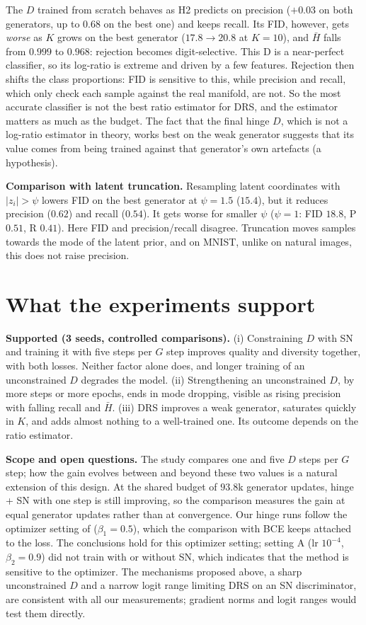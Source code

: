\documentclass[10pt,a4paper]{article}
\newcommand{\Hc}{\bar H}
\begin{document}
The $D$ trained from scratch behaves as H2 predicts on precision ($+0.03$ on both generators, up to $0.68$ on the best one) and keeps recall. Its FID, however, gets \emph{worse} as $K$ grows on the best generator ($17.8\to20.8$ at $K=10$), and $\Hc$ falls from $0.999$ to $0.968$: rejection becomes digit-selective. This D is a near-perfect classifier, so its log-ratio is extreme and driven by a few features. Rejection then shifts the class proportions: FID is sensitive to this, while precision and recall, which only check each sample against the real manifold, are not. So the most accurate classifier is not the best ratio estimator for DRS, and the estimator matters as much as the budget. The fact that the final hinge $D$, which is not a log-ratio estimator in theory, works best on the weak generator suggests that its value comes from being trained against that generator's own artefacts (a hypothesis).

\textbf{Comparison with latent truncation.} Resampling latent coordinates with $|z_i|>\psi$ \cite{brock2019} lowers FID on the best generator at $\psi=1.5$ ($15.4$), but it reduces precision ($0.62$) and recall ($0.54$). It gets worse for smaller $\psi$ ($\psi=1$: FID $18.8$, P $0.51$, R $0.41$). Here FID and precision/recall disagree. Truncation moves samples towards the mode of the latent prior, and on MNIST, unlike on natural images, this does not raise precision.

\section{What the experiments support}
\textbf{Supported (3 seeds, controlled comparisons).} (i) Constraining $D$ with SN and training it with five steps per $G$ step improves quality and diversity together, with both losses. Neither factor alone does, and longer training of an unconstrained $D$ degrades the model. (ii) Strengthening an unconstrained $D$, by more steps or more epochs, ends in mode dropping, visible as rising precision with falling recall and $\Hc$. (iii) DRS improves a weak generator, saturates quickly in $K$, and adds almost nothing to a well-trained one. Its outcome depends on the ratio estimator.

\textbf{Scope and open questions.} The study compares one and five $D$ steps per $G$ step; how the gain evolves between and beyond these two values is a natural extension of this design. At the shared budget of $93.8$k generator updates, hinge + SN with one step is still improving, so the comparison measures the gain at equal generator updates rather than at convergence. Our hinge runs follow the optimizer setting of \cite{miyato2018} ($\beta_1=0.5$), which the comparison with BCE keeps attached to the loss. The conclusions hold for this optimizer setting; setting A (lr $10^{-4}$, $\beta_2=0.9$) did not train with or without SN, which indicates that the method is sensitive to the optimizer. The mechanisms proposed above, a sharp unconstrained $D$ and a narrow logit range limiting DRS on an SN discriminator, are consistent with all our measurements; gradient norms and logit ranges would test them directly.
\end{document}

